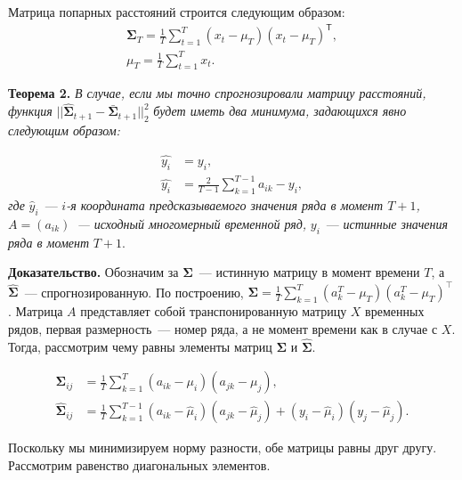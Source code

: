 \documentclass{article}
\begin{document}
Матрица попарных расстояний строится следующим образом:
\begin{gather*}
	{\mathbf{\Sigma}}_T = \frac{1}{T} \sum_{t=1}^{T} (x_t - \mu_T)(x_t - \mu_T)^\mathsf{T},\\
	\mu_T = \frac{1}{T} \sum_{t=1}^{T} x_t.
\end{gather*}

\textbf{Теорема 2.} \textit{В случае, если мы точно спрогнозировали матрицу расстояний, функция} $||\hat{\mathbf{\Sigma}}_{t+1} - \bar{\mathbf{\Sigma}}_{t+1}||_2^2$ \textit{будет иметь два минимума, задающихся явно следующим образом:}

\begin{align*}
	\hat{y_i} &= y_i,\\
	\hat{y_i} &= \frac{2}{T-1} \sum_{k=1}^{T-1} a_{ik} - y_i,
\end{align*}
\textit{где} $\hat{y}_i$~--- $i$\textit{-я координата предсказываемого значения ряда в момент $T+1$, $A=(a_{ik})$~--- исходный многомерный временной ряд,} $y_i$~--- \textit{истинные значения ряда в момент} $T+1$.

\textbf{Доказательство.} Обозначим за $\mathbf{\Sigma}$~--- истинную матрицу в момент времени $T$, а $\hat{\mathbf{\Sigma}}$~--- спрогнозированную. По построению, ${\mathbf{\Sigma}} = \frac{1}{T} \sum_{k=1}^{T} (a^T_k - \mu_T)(a^T_k - \mu_T)^\intercal\texttt{}$. Матрица $A$ представляет собой транспонированную матрицу $X$ временных рядов, первая размерность~--- номер ряда, а не момент времени как в случае с $X$. Тогда, рассмотрим чему равны элементы матриц $\mathbf{\Sigma}$ и $\hat{\mathbf{\Sigma}}$.

\begin{align*}
	\mathbf{\Sigma}_{ij} &= \frac{1}{T}\sum_{k=1}^{T}(a_{ik} - \mu_i)(a_{jk}-\mu_j),\\
	\hat{\mathbf{\Sigma}}_{ij} &= \frac{1}{T}\sum_{k=1}^{T-1}(a_{ik} - \hat{\mu}_i)(a_{jk}-\hat{\mu}_j) + (y_i - \hat{\mu}_i)(y_j - \hat{\mu}_j).
\end{align*}

Поскольку мы минимизируем норму разности, обе матрицы равны друг другу. Рассмотрим равенство диагональных элементов.
\end{document}
